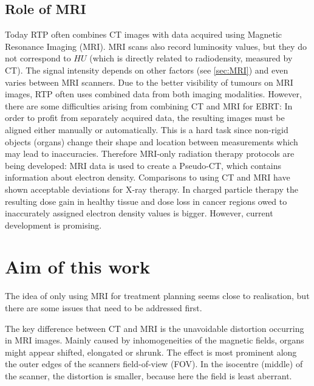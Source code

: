 \subsection{Role of MRI}
Today RTP often combines CT images with data acquired using Magnetic Resonance Imaging (MRI).
MRI scans also record luminosity values, but they do not correspond to $HU$ (which is directly related to radiodensity, measured by CT).
The signal intensity depends on other factors (see \ref{sec:MRI}) and even varies between MRI scanners.
Due to the better visibility of tumours on MRI images, RTP often uses combined data from both imaging modalities.
However, there are some difficulties arising from combining CT and MRI for EBRT:
In order to profit from separately acquired data, the resulting images must be aligned either manually or automatically. This is a hard task since non-rigid objects (organs) change their shape and location between measurements which may lead to inaccuracies.
Therefore MRI-only radiation therapy protocols are being developed:
MRI data is used to create a Pseudo-CT, which contains information about electron density. Comparisons to using CT and MRI have shown acceptable deviations for X-ray therapy.
In charged particle therapy the resulting dose gain in healthy tissue and dose loss in cancer regions owed to inaccurately assigned electron density values is bigger.
However, current development is promising. \cite{Rank2013, Stanescu2006, Nyholm2015, Greer2015, Chen2004}



\section{Aim of this work}
The idea of only using MRI for treatment planning seems close to realisation, but there are some issues that need to be addressed first.

The key difference between CT and MRI is the unavoidable distortion occurring in MRI images.
Mainly caused by inhomogeneities of the magnetic fields, organs might appear shifted, elongated or shrunk.
The effect is most prominent along the outer edges of the scanners field-of-view (FOV).
In the isocentre (middle) of the scanner, the distortion is smaller, because here the field is least aberrant.


